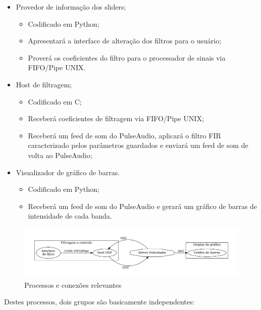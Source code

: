 \begin{itemize}
    \item Provedor de informação dos sliders;
    \begin{itemize}
        \item Codificado em Python;
        \item Apresentará a interface de alteração dos filtros para o usuário;
        \item Proverá os coeficientes do filtro para o processador de sinais via FIFO/Pipe UNIX.
    \end{itemize}
    \item Host de filtragem;
    \begin{itemize}
        \item Codificado em C;
        \item Receberá coeficientes de filtragem via FIFO/Pipe UNIX;
        \item Receberá um feed de som do PulseAudio, aplicará o filtro FIR caracterizado pelos parâmetros guardados e enviará um feed de som de volta ao PulseAudio;
    \end{itemize}
    \item Visualizador de gráfico de barras.
    \begin{itemize}
        \item Codificado em Python;
        \item Receberá um feed de som do PulseAudio e gerará um gráfico de barras de intensidade de cada banda.
    \end{itemize}
\end{itemize}

\begin{figure}[H]
    \centering
    \includegraphics[scale=0.45]{fig/app.pdf}
    \caption{Processos e conexões relevantes}
    \label{fig:app}
\end{figure}

Destes processos, dois grupos são basicamente independentes:

